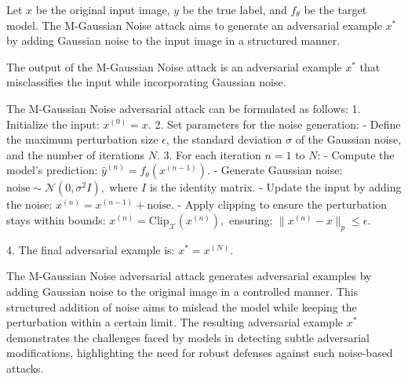 Let \( x \) be the original input image, \( y \) be the true label, and \( f_{\theta} \) be the target model. The M-Gaussian Noise attack aims to generate an adversarial example \( x^* \) by adding Gaussian noise to the input image in a structured manner.

The output of the M-Gaussian Noise attack is an adversarial example \( x^* \) that misclassifies the input while incorporating Gaussian noise.

The M-Gaussian Noise adversarial attack can be formulated as follows:
1. Initialize the input:
   $
   x^{(0)} = x.
   $
2. Set parameters for the noise generation:
   - Define the maximum perturbation size \( \epsilon \), the standard deviation \( \sigma \) of the Gaussian noise, and the number of iterations \( N \).
3. For each iteration \( n = 1 \) to \( N \):
   - Compute the model's prediction:
   $
   \hat{y}^{(n)} = f_{\theta}(x^{(n-1)}).
   $
   - Generate Gaussian noise:
   $
   \text{noise} \sim \mathcal{N}(0, \sigma^2 I),
   $
   where \( I \) is the identity matrix.
   - Update the input by adding the noise:
   $
   x^{(n)} = x^{(n-1)} + \text{noise}.
   $
   - Apply clipping to ensure the perturbation stays within bounds:
   $
   x^{(n)} = \text{Clip}_{\mathcal{X}}(x^{(n)}),
   $
   ensuring:
   $
   \|x^{(n)} - x\|_p \leq \epsilon.
   $

4. The final adversarial example is:
   $
   x^* = x^{(N)}.
   $

The M-Gaussian Noise adversarial attack generates adversarial examples by adding Gaussian noise to the original image in a controlled manner. This structured addition of noise aims to mislead the model while keeping the perturbation within a certain limit. The resulting adversarial example \( x^* \) demonstrates the challenges faced by models in detecting subtle adversarial modifications, highlighting the need for robust defenses against such noise-based attacks.
